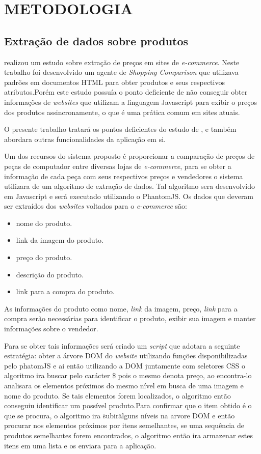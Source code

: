 \section{METODOLOGIA}
\label{sec:metod}

\subsection{Extração de dados sobre produtos}

\cite{alonso2015agente} realizou um estudo sobre extração de preços em sites de \emph{e-commerce}. Neste trabalho foi desenvolvido um agente de \emph{Shopping Comparison} que utilizava padrões em documentos HTML para obter produtos e seus respectivos atributos.Porém este estudo possuía o ponto deficiente de não conseguir obter informações de \emph{websites} que utilizam a linguagem Javascript para exibir o preços dos produtos assincronamente, o que é uma prática comum em sites atuais.

O presente trabalho tratará os pontos deficientes do estudo de , e também abordara outras funcionalidades da aplicação em si.

Um dos recursos do sistema proposto é proporcionar a comparação de preços de peças de computador entre diversas lojas de \emph{e-commerce}, para se obter a informação de cada peça com seus respectivos preços e vendedores o sistema utilizara de um algoritmo de extração de dados. Tal algoritmo sera desenvolvido em Javascript e será executado utilizando o PhantomJS.
Os dados que deveram ser extraídos dos \emph{websites} voltados para o \emph{e-commerce} são:


\begin{itemize}
\setlength{\itemsep}{-0.3ex}
\item nome do produto.
\item link da imagem do produto.
\item preço do produto.
\item descrição do produto.
\item link para a compra do produto.
\end{itemize}


As informações do produto como nome, \emph{link} da imagem, preço, \emph{link} para a compra serão necessárias para identificar o produto, exibir sua imagem e manter informações sobre o vendedor.

Para se obter tais informações será criado um \emph{script} que adotara a seguinte estratégia: obter a árvore DOM do \emph{website} utilizando funções disponibilizadas pelo phatomJS e ai então utilizando a DOM juntamente com seletores CSS o algoritmo ira buscar pelo carácter \$ pois o mesmo denota preço, ao encontra-lo  analisara os elementos próximos do mesmo nível em busca de uma imagem e nome do produto. Se tais elementos forem localizados, o algoritmo então conseguiu identificar um possível produto.Para confirmar que o item obtido é o que se procura, o algoritmo ira \"subir\" alguns níveis na arvore DOM e então procurar nos elementos próximos por itens semelhantes, se uma sequência de produtos semelhantes forem encontrados, o algoritmo então ira armazenar estes itens em uma lista e os enviara para a aplicação.


